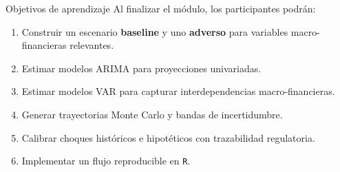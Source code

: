 \documentclass[10pt,aspectratio=169]{beamer}
\newcommand{\baseline}{\textcolor{MacropolTeal}{\textbf{baseline}}}
\newcommand{\adverso}{\textcolor{red!70!black}{\textbf{adverso}}}
\newcommand{\R}{\texttt{R}}
\begin{document}
\begin{frame}{Objetivos de aprendizaje}
Al finalizar el módulo, los participantes podrán:

\begin{enumerate}
  \item Construir un escenario \baseline{} y uno \adverso{} para variables macro-financieras relevantes.
  \item Estimar modelos ARIMA para proyecciones univariadas.
  \item Estimar modelos VAR para capturar interdependencias macro-financieras.
  \item Generar trayectorias Monte Carlo y bandas de incertidumbre.
  \item Calibrar choques históricos e hipotéticos con trazabilidad regulatoria.
  \item Implementar un flujo reproducible en \R{}.
\end{enumerate}

\end{frame}
\end{document}

